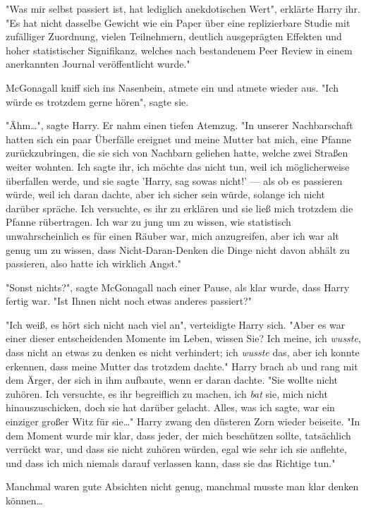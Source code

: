 {"Was mir selbst passiert ist, hat lediglich anekdotischen Wert", erklärte Harry ihr. "Es hat nicht dasselbe Gewicht wie ein Paper über eine replizierbare Studie mit zufälliger Zuordnung, vielen Teilnehmern, deutlich ausgeprägten Effekten und hoher statistischer Signifikanz, welches nach bestandenem Peer Review in einem anerkannten Journal veröffentlicht wurde."

McGonagall kniff sich ins Nasenbein, atmete ein und atmete wieder aus. "Ich würde es trotzdem gerne hören", sagte sie.

"Ähm…", sagte Harry. Er nahm einen tiefen Atemzug. "In unserer Nachbarschaft hatten sich ein paar Überfälle ereignet und meine Mutter bat mich, eine Pfanne zurückzubringen, die sie sich von Nachbarn geliehen hatte, welche zwei Straßen weiter wohnten. Ich sagte ihr, ich möchte das nicht tun, weil ich möglicherweise überfallen werde, und sie sagte 'Harry, sag sowas nicht!' --- als ob es passieren würde, weil ich daran dachte, aber ich sicher sein würde, solange ich nicht darüber spräche. Ich versuchte, es ihr zu erklären und sie ließ mich trotzdem die Pfanne rübertragen. Ich war zu jung um zu wissen, wie statistisch unwahrscheinlich es für einen Räuber war, mich anzugreifen, aber ich war alt genug um zu wissen, dass Nicht-Daran-Denken die Dinge nicht davon abhält zu passieren, also hatte ich wirklich Angst."

"Sonst nichts?", sagte McGonagall nach einer Pause, als klar wurde, dass Harry fertig war. "Ist Ihnen nicht noch etwas anderes passiert?"

"Ich weiß, es hört sich nicht nach viel an", verteidigte Harry sich. "Aber es war einer dieser entscheidenden Momente im Leben, wissen Sie? Ich meine, ich \emph{wusste}, dass nicht an etwas zu denken es nicht verhindert; ich \emph{wusste} das, aber ich konnte erkennen, dass meine Mutter das trotzdem dachte." Harry brach ab und rang mit dem Ärger, der sich in ihm aufbaute, wenn er daran dachte. "Sie wollte nicht zuhören. Ich versuchte, es ihr begreiflich zu machen, ich \emph{bat} sie, mich nicht hinauszuschicken, doch sie hat darüber gelacht. Alles, was ich sagte, war ein einziger großer Witz für sie…" Harry zwang den düsteren Zorn wieder beiseite. "In dem Moment wurde mir klar, dass jeder, der mich beschützen sollte, tatsächlich verrückt war, und dass sie nicht zuhören würden, egal wie sehr ich sie anflehte, und dass ich mich niemals darauf verlassen kann, dass sie das Richtige tun."

Manchmal waren gute Absichten nicht genug, manchmal musste man klar denken können…

}
